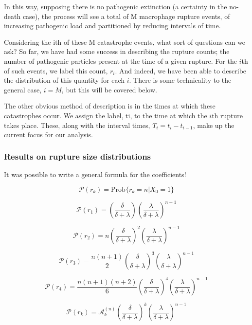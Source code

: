 In this way, supposing there is no pathogenic extinction (a certainty in the no-death case), the process will see a total of M macrophage rupture events, of increasing pathogenic load and partitioned by reducing intervals of time. 

Considering the ith of these M catastrophe events, what sort of questions can we ask? So far, we have had some success in describing the rupture counts; the number of pathogenic particles present at the time of a given rupture. For the $i$th of such events, we label this count, $r_i$. And indeed, we have been able to describe the distribution of this quantity for each $i$. There is some technicality to the general case, $i = M$, but this will be covered below. 

The other obvious method of description is in the times at which these catastrophes occur. We assign the label, ti, to the time at which the $i$th rupture takes place. These, along with the interval times, $T_i = t_i - t_{i-1}$, make up the current focus for our analysis. 







\subsubsection*{Results on rupture size distributions}




It was possible to write a general formula for the coefficients!

$$\mathcal{P}(r_k) = \mathrm{Prob}\{r_k = n|X_0=1\}$$

$$\mathcal{P}(r_1) = \left(\frac{\delta}{\delta + \lambda}\right)^{} \left(\frac{\lambda}{\delta + \lambda}\right)^{n-1}$$

$$\mathcal{P}(r_2) = n\left(\frac{\delta}{\delta + \lambda}\right)^{2} \left(\frac{\lambda}{\delta + \lambda}\right)^{n-1}$$

$$\mathcal{P}(r_3) = \frac{n(n+1)}{2}\left(\frac{\delta}{\delta + \lambda}\right)^{3} \left(\frac{\lambda}{\delta + \lambda}\right)^{n-1}$$

$$\mathcal{P}(r_4) = \frac{n(n+1)(n+2)}{6}\left(\frac{\delta}{\delta + \lambda}\right)^{4} \left(\frac{\lambda}{\delta + \lambda}\right)^{n-1}$$


$$\mathcal{P}(r_k) = \mathcal{A}^{(n)}_{k}\left(\frac{\delta}{\delta + \lambda}\right)^{k} \left(\frac{\lambda}{\delta + \lambda}\right)^{n-1}$$


